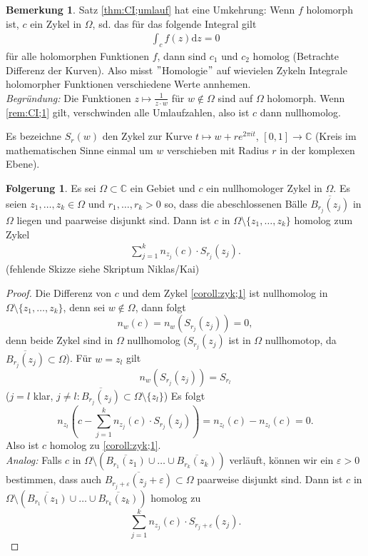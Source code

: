 \documentclass[11pt,titlepage]{article}
\theoremstyle{definition}
\newtheorem{corollary}[theorem]{Folgerung}
\newtheorem{remark}{Bemerkung}
\theoremstyle{remark}
\begin{document}
	\begin{remark}
		Satz \ref{thm:CI;umlauf} hat eine Umkehrung: Wenn $f$ holomorph ist, $c$ ein Zykel in $\Omega$, sd. 
		das für das folgende Integral gilt
		\begin{eqnarray}
			\int_c f(z)\mathrm{d}z=0 \label{rem:CI;1}
		\end{eqnarray}
		für alle holomorphen Funktionen $f$, dann sind $c_1$ und $c_2$ homolog (Betrachte Differenz der 
		Kurven). Also misst $"$Homologie$"$ auf wievielen Zykeln Integrale holomorpher Funktionen 
		verschiedene Werte annhemen. \\
		\textsl{Begründung:} Die Funktionen $z\mapsto \frac{1}{z\cdot w}$ für $w\notin\Omega$ sind auf 
		$\Omega$ holomorph. Wenn \ref{rem:CI;1} gilt, verschwinden alle Umlaufzahlen, also ist $c$ dann 
		nullhomolog.
	\end{remark}
	
	Es bezeichne $S_r (w)$ den Zykel zur Kurve $t\mapsto w+re^{2\pi it}$, $[0,1]\to\mathbb{C}$ 
	(Kreis im mathematischen Sinne einmal um $w$ verschieben mit Radius $r$ in der komplexen Ebene).
	
	\begin{corollary}
		Es sei $\Omega\subset\mathbb{C}$ ein Gebiet und $c$ ein nullhomologer Zykel in $\Omega$. 
		Es seien $z_1,\ldots,z_k\in\Omega$ und $r_1,\ldots,r_k >0$ so, dass die abeschlossenen 
		Bälle $\overline{B_{r_j}(z_j)}$ in $\Omega$ liegen und paarweise disjunkt sind. 
		Dann ist $c$ in $\Omega\setminus\{z_1,\ldots,z_k\}$ homolog zum Zykel
		\begin{eqnarray}
			\sum_{j=1}^k n_{z_j}(c)\cdot S_{r_j}(z_j). \label{coroll:zyk;1}
		\end{eqnarray}
		(fehlende Skizze siehe Skriptum Niklas/Kai)\\
	\end{corollary}
	
	\begin{proof}
		Die Differenz von $c$ und dem Zykel \ref{coroll:zyk;1} ist nullhomolog in $\Omega\setminus\{z_1,\ldots,
		z_k\}$, denn sei $w\notin\Omega$, dann folgt
		\[ n_w(c)=n_w (S_{r_j}(z_j))=0, \]
		denn beide Zykel sind in $\Omega$ nullhomolog ($S_{r_j}(z_j)$ ist in $\Omega$ nullhomotop, da 
		$\overline{B_{r_j}(z_j)}\subset\Omega$). Für $w=z_l$ gilt
		\[ n_w(S_{r_j}(z_j))=S_{r_l} \]
		($j=l$ klar, $j\neq l:\overline{B_{r_j}(z_j)}\subset\Omega\setminus\{z_l\}$) Es folgt
		\[ n_{z_l}\left(c-\sum_{j=1}^k n_{z_j}(c)\cdot S_{r_j}(z_j)\right)=n_{z_l}(c)-n_{z_l}(c)=0. \]
		Also ist $c$ homolog zu \ref{coroll:zyk;1}.\\
		\textsl{Analog:} Falls $c$ in $\Omega\setminus\left( \overline{B_{r_1}(z_1)}\cup\ldots\cup
		\overline{B_{r_k}(z_k)}\right)$ verläuft, können wir ein $\varepsilon>0$ bestimmen, dass auch 
		$\overline{B_{r_j +\varepsilon}(z_j +\varepsilon)}\subset\Omega$ paarweise disjunkt sind. 
		Dann ist $c$ in $\Omega\setminus\left( \overline{B_{r_1}(z_1)}\cup\ldots\cup
		\overline{B_{r_k}(z_k)}\right)$ homolog zu
		\[ \sum_{j=1}^k n_{z_j}(c)\cdot S_{r_j +\varepsilon}(z_j). \]
	\end{proof}
	
\end{document}
